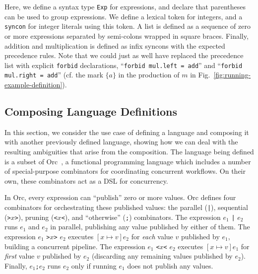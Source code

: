 \documentclass[acmsmall,review,anonymous]{acmart}\settopmatter{printfolios=true,printccs=false,printacmref=false}
\newcommand{\ocaml}{\lstinline[language={[objective]caml}]}
\newcommand{\syncon}{\lstinline[language=syncon]}
\begin{document}
\noindent Here, we define a syntax type \syncon{Exp} for
expressions, and declare that parentheses can be used to group
expressions. We define a lexical token for integers, and a
\syncon{syncon} for integer literals using this token. A list is
defined as a sequence of zero or more expressions separated by
semi-colons wrapped in square braces. Finally, addition and
multiplication is defined as infix syncons with the expected
precedence rules. Note that we could just as well have replaced
the precedence list with explicit \syncon{forbid} declarations,
``\syncon{forbid mul.left = add}'' and ``\syncon{forbid mul.right = add}''
(cf. the mark $\{a\}$ in the production of $m$ in
Fig.~\ref{fig:running-example-definition}).



\subsection{Composing Language Definitions} \label{sec:evaluation-orc}

In this section, we consider the use case of defining a language
and composing it with another previously defined language, showing
how we can deal with the resulting ambiguities that arise from the
composition.
%
The language being defined is a subset of
Orc~\cite{kitchinOrc2009}, a functional programming language which
includes a number of special-purpose combinators for coordinating
concurrent workflows. On their own, these combinators act as a DSL
for concurrency.

In Orc, every expression can ``publish'' zero or more values. Orc
defines four combinators for orchestrating these published values:
the parallel (\ocaml{|}), sequential (\ocaml{>}$x$\ocaml{>}),
pruning (\ocaml{<}$x$\ocaml{<}), and ``otherwise'' (\ocaml{;})
combinators.
%
The expression $e_1$ \ocaml{|} $e_2$ runs $e_1$ and
$e_2$ in parallel, publishing any value published by either of
them.
%
The expression $e_1$ \ocaml{>}$x$\ocaml{>} $e_2$ executes
$[x\mapsto v]e_2$ for \emph{each} value $v$ published by $e_1$,
building a concurrent pipeline.
%
The expression $e_1$ \ocaml{<}$x$\ocaml{<} $e_2$ executes
$[x\mapsto v]e_1$ for \emph{first} value $v$ published by $e_2$
(discarding any remaining values published by $e_2$).
%
Finally, $e_1$\ocaml{;}$e_2$ runs $e_2$ only if running $e_1$ does
not publish any values.
\end{document}
